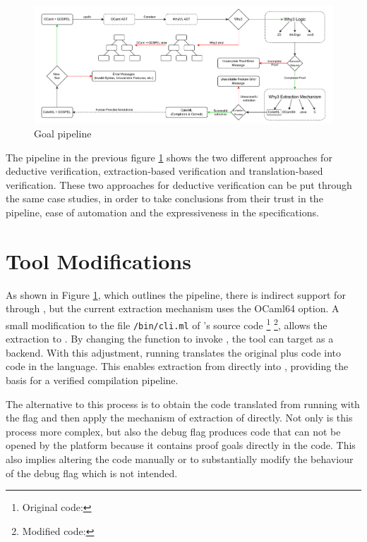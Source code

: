 \begin{figure}[H]
    \centering
    \includegraphics[width=\linewidth]{images/goal_pipeline.pdf}
    \caption{Goal pipeline}
    \label{fig:GoalPipeline}
\end{figure}

The pipeline in the previous figure \ref{fig:GoalPipeline} shows the two different approaches for deductive verification, extraction-based verification
and translation-based verification. These two approaches for deductive verification can be put through the same case studies, in order to take 
conclusions from their trust in the pipeline, ease of automation and the expressiveness in the specifications.

\section{Tool Modifications}

As shown in Figure \ref{fig:GoalPipeline}, which outlines the \cameleer pipeline, there is indirect support for \cml 
through \cameleer, but the current extraction mechanism uses the OCaml64 option. 
A small modification to the file \texttt{/bin/cli.ml} of \cameleer 's source code
\footnote{Original \cameleer code: } 
\footnote{Modified \cameleer code: }, 
allows the extraction to \cml. By changing the  function to invoke 
, the tool can target \cml as a backend. With this adjustment, running 
 translates the original \ocaml plus \gospel code into code in the \cml language. 
This enables extraction from \ocaml directly into \cml, providing the basis for a verified compilation pipeline.

The alternative to this process is to obtain the code translated \whyml from running \cameleer with the flag  
and then apply the mechanism of extraction of \whythree directly. Not only is this process more complex, but also the debug flag 
produces code that can not be opened by the \whythree platform because it contains proof goals directly in the code. This also implies
altering the code manually or to substantially modify the behaviour of the debug flag which is not intended.

